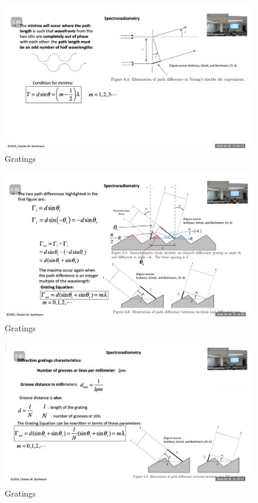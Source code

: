\documentclass{article}
\begin{document}
\begin{figure}[h!]
\centering
\includegraphics[scale=.4]{Radiometry/Week5/Notes/Gratings/MUM4.png}
\caption{Gratings}
\label{fig:Blackbody}
\end{figure}

\begin{figure}[h!]
\centering
\includegraphics[scale=.4]{Radiometry/Week5/Notes/Gratings/MUM5.png}
\caption{Gratings}
\label{fig:Blackbody}
\end{figure}

\begin{figure}[h!]
\centering
\includegraphics[scale=.4]{Radiometry/Week5/Notes/Gratings/MUM6.png}
\caption{Gratings}
\label{fig:Blackbody}
\end{figure}
\end{document}
